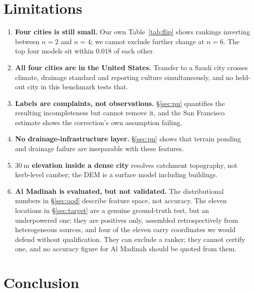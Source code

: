 \documentclass[11pt]{article}
\begin{document}
\section{Limitations}\label{sec:limits}

\begin{enumerate}\itemsep2pt
  \item \textbf{Four cities is still small.} Our own Table~\ref{tab:flip} shows
    rankings inverting between $n{=}2$ and $n{=}4$; we cannot exclude further
    change at $n{=}6$. The top four models sit within $0.018$ of each other.
  \item \textbf{All four cities are in the United States.} Transfer to a Saudi
    city crosses climate, drainage standard and reporting culture simultaneously,
    and no held-out city in this benchmark tests that.
  \item \textbf{Labels are complaints, not observations.} \S\ref{sec:pu}
    quantifies the resulting incompleteness but cannot remove it, and the
    San Francisco estimate shows the correction's own assumption failing.
  \item \textbf{No drainage-infrastructure layer.} \S\ref{sec:pu} shows that
    terrain ponding and drainage failure are inseparable with these features.
  \item \textbf{$\SI{30}{\metre}$ elevation inside a dense city} resolves
    catchment topography, not kerb-level camber; the DEM is a surface model
    including buildings.
  \item \textbf{Al Madinah is evaluated, but not validated.} The distributional
    numbers in \S\ref{sec:ood} describe feature space, not accuracy. The eleven
    locations in \S\ref{sec:target} are a genuine ground-truth test, but an
    underpowered one: they are positives only, assembled retrospectively from
    heterogeneous sources, and four of the eleven carry coordinates we would
    defend without qualification. They can exclude a ranker; they cannot certify
    one, and no accuracy figure for Al Madinah should be quoted from them.
\end{enumerate}

\section{Conclusion}\label{sec:conclusion}
\end{document}
